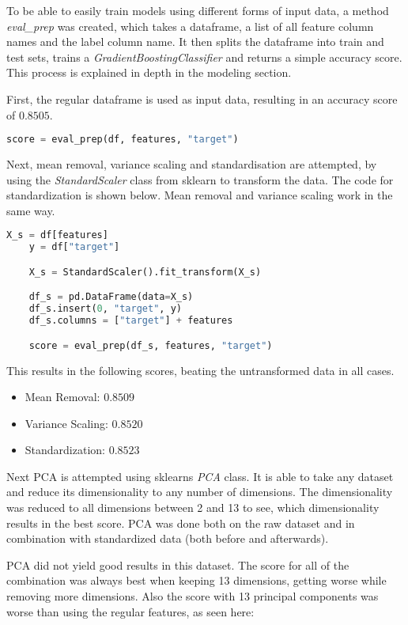 To be able to easily train models using different forms of input data, a method \emph{eval\_prep} was created,
which takes a dataframe, a list of all feature column names and the label column name. It then splits the dataframe
into train and test sets, trains a \emph{GradientBoostingClassifier} and returns a simple accuracy score.
This process is explained in depth in the modeling section.

First, the regular dataframe is used as input data, resulting in an accuracy score of $0.8505$.

\begin{lstlisting}[language=Python]
    score = eval_prep(df, features, "target")
\end{lstlisting}

Next, mean removal, variance scaling and standardisation are attempted, by using the \emph{StandardScaler}
class from sklearn to transform the data. The code for standardization is shown below.
Mean removal and variance scaling work in the same way.

\begin{lstlisting}[language=Python]
    X_s = df[features]
    y = df["target"]

    X_s = StandardScaler().fit_transform(X_s)

    df_s = pd.DataFrame(data=X_s)
    df_s.insert(0, "target", y)
    df_s.columns = ["target"] + features

    score = eval_prep(df_s, features, "target")
\end{lstlisting}

This results in the following scores, beating the untransformed data in all cases.

\begin{itemize}
    \item Mean Removal: $0.8509$
    \item Variance Scaling: $0.8520$
    \item Standardization: $0.8523$
\end{itemize}

Next \ac{PCA} is attempted using sklearns \emph{PCA} class. It is able to take any dataset and reduce
its dimensionality to any number of dimensions. The dimensionality was reduced to all dimensions
between 2 and 13 to see, which dimensionality results in the best score.
\ac{PCA} was done both on the raw dataset and in combination with standardized data (both before and afterwards).

\ac{PCA} did not yield good results in this dataset. The score for all of the combination was always best
when keeping 13 dimensions, getting worse while removing more dimensions. Also the score with 13 principal
components was worse than using the regular features, as seen here:

